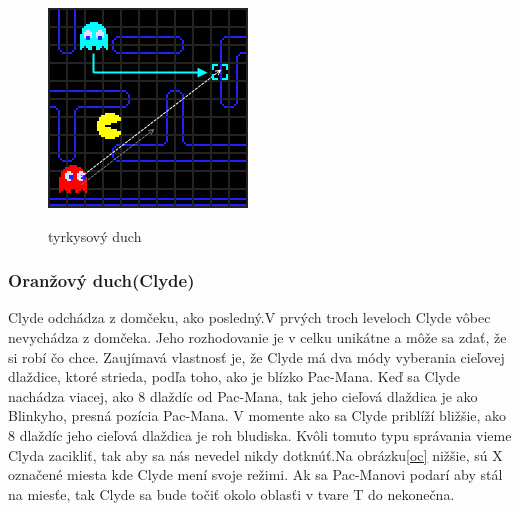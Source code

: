 \documentclass[10pt,oneside,slovak,a4paper]{article}
\begin{document}
\begin{figure} [h!]
  \includegraphics[scale=0.6]{inky-targeting.png}
  \caption{tyrkysový duch}
  \cite{2.zdroj}
\end{figure}
\subsubsection{Oranžový duch(Clyde)}\label{or}
Clyde odchádza z domčeku, ako posledný.V prvých troch leveloch Clyde vôbec nevychádza z domčeka. Jeho rozhodovanie je v celku unikátne a môže sa zdať, že si robí čo chce. Zaujímavá vlastnosť je, že Clyde má dva módy vyberania cieľovej dlaždice, ktoré strieda, podľa toho, ako je blízko Pac-Mana. Keď sa Clyde nachádza viacej, ako 8 dlaždíc od Pac-Mana, tak jeho cieľová dlaždica je ako Blinkyho, presná pozícia Pac-Mana. V momente ako sa Clyde priblíží bližšie, ako 8 dlaždíc jeho cieľová dlaždica je roh bludiska. Kvôli tomuto typu správania vieme Clyda zacikliť, tak aby sa nás nevedel nikdy dotknúť.Na obrázku\ref{oc} nižšie, sú X označené miesta kde Clyde mení svoje režimi. Ak sa Pac-Manovi podarí aby stál na miesťe, tak Clyde sa bude točiť okolo oblasťi v tvare T do nekonečna.\cite{2.zdroj}
\end{document}
